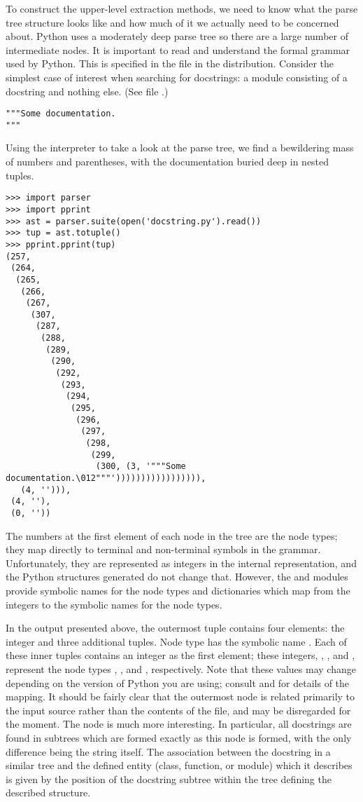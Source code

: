 To construct the upper-level extraction methods, we need to know what
the parse tree structure looks like and how much of it we actually
need to be concerned about.  Python uses a moderately deep parse tree
so there are a large number of intermediate nodes.  It is important to
read and understand the formal grammar used by Python.  This is
specified in the file  in the distribution.
Consider the simplest case of interest when searching for docstrings:
a module consisting of a docstring and nothing else.  (See file
.)

\begin{verbatim}
"""Some documentation.
"""
\end{verbatim}

Using the interpreter to take a look at the parse tree, we find a
bewildering mass of numbers and parentheses, with the documentation
buried deep in nested tuples.

\begin{verbatim}
>>> import parser
>>> import pprint
>>> ast = parser.suite(open('docstring.py').read())
>>> tup = ast.totuple()
>>> pprint.pprint(tup)
(257,
 (264,
  (265,
   (266,
    (267,
     (307,
      (287,
       (288,
        (289,
         (290,
          (292,
           (293,
            (294,
             (295,
              (296,
               (297,
                (298,
                 (299,
                  (300, (3, '"""Some documentation.\012"""'))))))))))))))))),
   (4, ''))),
 (4, ''),
 (0, ''))
\end{verbatim}

The numbers at the first element of each node in the tree are the node
types; they map directly to terminal and non-terminal symbols in the
grammar.  Unfortunately, they are represented as integers in the
internal representation, and the Python structures generated do not
change that.  However, the  and  modules
provide symbolic names for the node types and dictionaries which map
from the integers to the symbolic names for the node types.

In the output presented above, the outermost tuple contains four
elements: the integer  and three additional tuples.  Node
type  has the symbolic name .  Each of
these inner tuples contains an integer as the first element; these
integers, , , and , represent the node types
, , and ,
respectively.
Note that these values may change depending on the version of Python
you are using; consult  and  for
details of the mapping.  It should be fairly clear that the outermost
node is related primarily to the input source rather than the contents
of the file, and may be disregarded for the moment.  The 
node is much more interesting.  In particular, all docstrings are
found in subtrees which are formed exactly as this node is formed,
with the only difference being the string itself.  The association
between the docstring in a similar tree and the defined entity (class,
function, or module) which it describes is given by the position of
the docstring subtree within the tree defining the described
structure.

